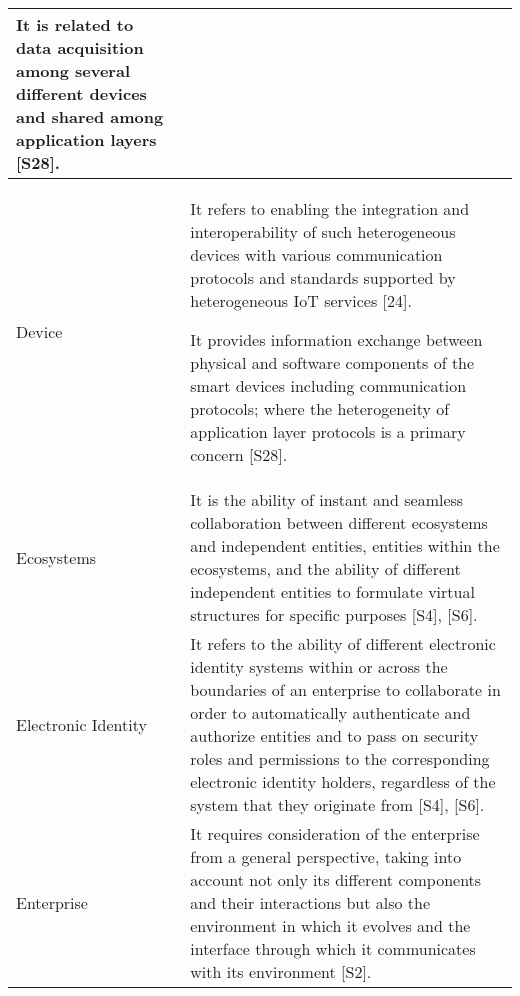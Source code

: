 \begin{longtable}{|p{2.3cm}|p{14cm}|}
     It is related to data acquisition among several different devices and shared among application layers [S28]. 
     \\\hline 
     
     
    Device
    &
    
    It refers to enabling the integration and interoperability of such heterogeneous devices with various communication protocols and standards supported by heterogeneous IoT services [24]. 
    
    It provides information exchange between physical and software components of the smart devices including communication protocols; where the heterogeneity of application layer protocols is a primary concern [S28]. 
\\\hline
    Ecosystems & It is the ability of instant and seamless collaboration between different ecosystems and independent entities, entities within the ecosystems, and the ability of different independent entities to formulate virtual structures for specific purposes [S4], [S6].
    \\\hline
    
    Electronic Identity & It refers to the ability of different electronic identity systems within or across the boundaries of an enterprise to collaborate in order to automatically authenticate and authorize entities and to pass on security roles and permissions to the corresponding electronic identity holders, regardless of the system that they originate from [S4], [S6].
    \\\hline
    Enterprise 
    &
    It requires consideration of the enterprise from a general perspective, taking into account not only its different components and their interactions but also the environment in which it evolves and the interface through which it communicates with its environment [S2].
    

\end{longtable}
